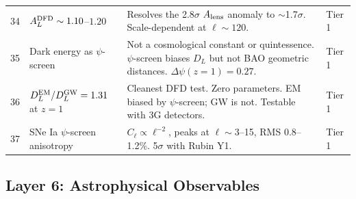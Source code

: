 \documentclass[12pt,a4paper]{article}
\begin{document}
\begin{longtable}{p{0.5cm}p{4cm}p{6.5cm}p{2.5cm}}
34 & $A_L^{\rm DFD} \sim 1.10$--$1.20$ &
  Resolves the 2.8$\sigma$ $A_{\rm lens}$ anomaly
  to $\sim$1.7$\sigma$.  Scale-dependent at $\ell \sim 120$. &
  Tier 1 \\[4pt]

35 & Dark energy as $\psi$-screen &
  Not a cosmological constant or quintessence.
  $\psi$-screen biases $D_L$ but not BAO geometric
  distances.  $\Delta\psi(z=1) = 0.27$. &
  Tier 1 \\[4pt]

36 & $D_L^{\rm EM}/D_L^{\rm GW} = 1.31$ at $z=1$ &
  Cleanest DFD test.  Zero parameters.
  EM biased by $\psi$-screen; GW is not.
  Testable with 3G detectors. &
  Tier 1 \\[4pt]

37 & SNe Ia $\psi$-screen anisotropy &
  $C_\ell \propto \ell^{-2}$, peaks at $\ell \sim 3$--15,
  RMS 0.8--1.2\%.  5$\sigma$ with Rubin Y1. &
  Tier 1 \\[4pt]

\bottomrule
\end{longtable}

\subsection{Layer 6: Astrophysical Observables}
\end{document}
